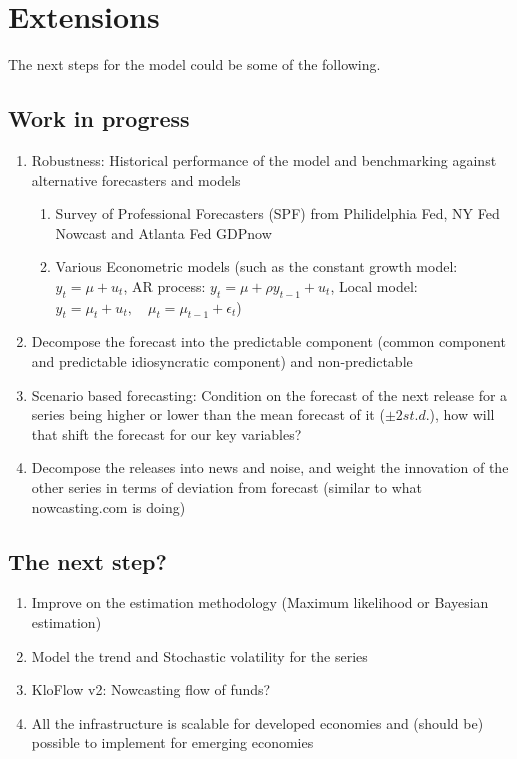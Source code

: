 \documentclass[12pt]{article}
\begin{document}
\FloatBarrier


\section{Extensions}
The next steps for the model could be some of the following.

\subsection{Work in progress}
\begin{enumerate}
	\item	Robustness: Historical performance of the model and benchmarking against alternative forecasters and models
	\begin{enumerate}
		\item 	Survey of Professional Forecasters (SPF) from Philidelphia Fed, NY Fed Nowcast and Atlanta Fed GDPnow
		\item 	Various Econometric models (such as the constant growth model: $y_{t} = \mu + u_{t}$, AR process: $y_{t} = \mu + \rho y_{t-1} + u_{t}$, Local model: $y_{t} = \mu_{t} + u_{t}, \quad \mu_{t}=\mu_{t-1}+\epsilon_{t}$)
	\end{enumerate}
	\item 	Decompose the forecast into the predictable component (common component and predictable idiosyncratic component) and non-predictable
	\item 	Scenario based forecasting: Condition on the forecast of the next release for a series being higher or lower than the mean forecast of it ($\pm 2 st.d.$), how will that shift the forecast for our key variables?
	\item 	Decompose the releases into news and noise, and weight the innovation of the other series in terms of deviation from forecast (similar to what nowcasting.com is doing)
\end{enumerate}

\subsection{The next step?}
\begin{enumerate}
	\item	Improve on the estimation methodology (Maximum likelihood or Bayesian estimation)
	\item	Model the trend and Stochastic volatility for the series
	\item 	KloFlow v2: Nowcasting flow of funds?
	\item 	All the infrastructure is scalable for developed economies and (should be) possible to implement for emerging economies
\end{enumerate}
\end{document}
